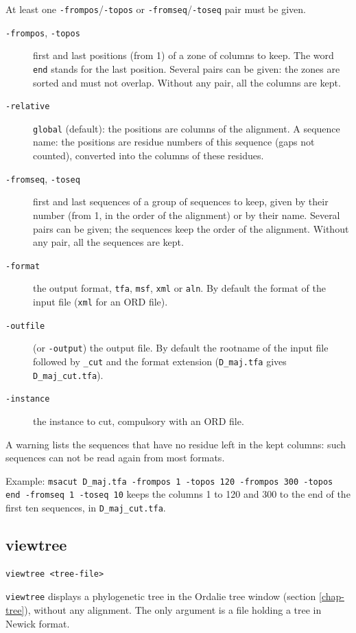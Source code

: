 \documentclass[a4paper]{article}
\begin{document}
At least one \texttt{-frompos}/\texttt{-topos} or \texttt{-fromseq}/\texttt{-toseq} pair must be given.
\begin{description}
\item[\texttt{-frompos}, \texttt{-topos}] first and last positions (from 1) of a zone of columns to keep. The word \texttt{end} stands for the last position. Several pairs can be given: the zones are sorted and must not overlap. Without any pair, all the columns are kept.
\item[\texttt{-relative}] \texttt{global} (default): the positions are columns of the alignment. A sequence name: the positions are residue numbers of this sequence (gaps not counted), converted into the columns of these residues.
\item[\texttt{-fromseq}, \texttt{-toseq}] first and last sequences of a group of sequences to keep, given by their number (from 1, in the order of the alignment) or by their name. Several pairs can be given; the sequences keep the order of the alignment. Without any pair, all the sequences are kept.
\item[\texttt{-format}] the output format, \texttt{tfa}, \texttt{msf}, \texttt{xml} or \texttt{aln}. By default the format of the input file (\texttt{xml} for an ORD file).
\item[\texttt{-outfile}] (or \texttt{-output}) the output file. By default the rootname of the input file followed by \texttt{\_cut} and the format extension (\texttt{D\_maj.tfa} gives \texttt{D\_maj\_cut.tfa}).
\item[\texttt{-instance}] the instance to cut, compulsory with an ORD file.
\end{description}
A warning lists the sequences that have no residue left in the kept columns: such sequences can not be read again from most formats.

Example: \texttt{msacut D\_maj.tfa -frompos 1 -topos 120 -frompos 300 -topos end -fromseq 1 -toseq 10} keeps the columns 1 to 120 and 300 to the end of the first ten sequences, in \texttt{D\_maj\_cut.tfa}.

\subsection{viewtree}
\begin{verbatim}
viewtree <tree-file>
\end{verbatim}
\texttt{viewtree} displays a phylogenetic tree in the Ordalie tree window (section \ref{chap-tree}), without any alignment. The only argument is a file holding a tree in Newick format.
\end{document}
